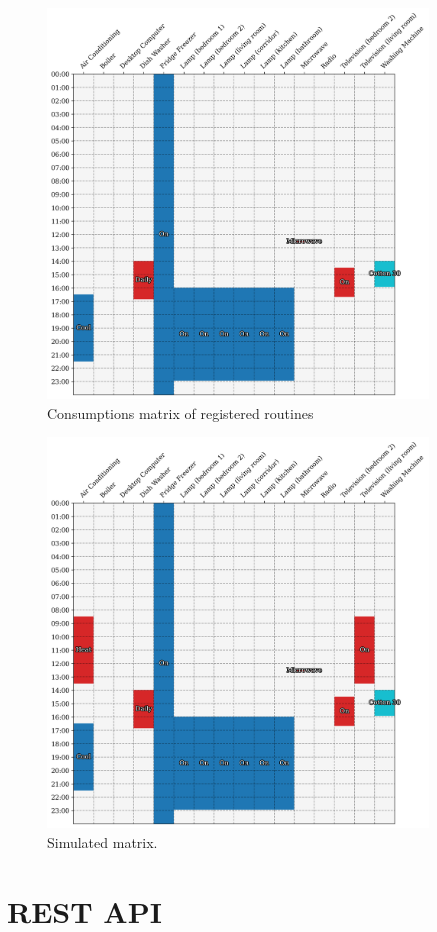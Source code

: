 \begin{figure}
    \centering
    \includegraphics[width=0.9\textwidth]{images/real_matrix.png}
    \caption{Consumptions matrix of registered routines}
    \label{fig:existing_consumption_matrix}
\end{figure}

\begin{figure}
    \centering
    \includegraphics[width=0.9\textwidth]{images/simulated_matrix.png}
    \caption{Simulated matrix.}
    \label{fig:simulated_consumption_matrix}
\end{figure}

\section{REST API}